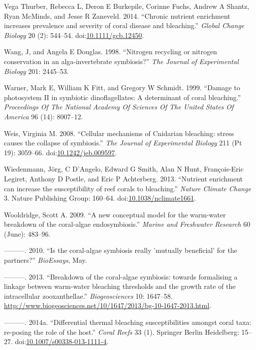 \documentclass[]{elsarticle} %
\begin{document}
\hypertarget{ref-VegaThurber:2014hk}{}
Vega Thurber, Rebecca L, Deron E Burkepile, Corinne Fuchs, Andrew A
Shantz, Ryan McMinds, and Jesse R Zaneveld. 2014. ``Chronic nutrient
enrichment increases prevalence and severity of coral disease and
bleaching.'' \emph{Global Change Biology} 20 (2): 544--54.
doi:\href{https://doi.org/10.1111/gcb.12450}{10.1111/gcb.12450}.

\hypertarget{ref-Wang:1998p128}{}
Wang, J, and Angela E Douglas. 1998. ``Nitrogen recycling or nitrogen
conservation in an alga-invertebrate symbiosis?'' \emph{The Journal of
Experimental Biology} 201: 2445--53.

\hypertarget{ref-Warner:1999p4239}{}
Warner, Mark E, William K Fitt, and Gregory W Schmidt. 1999. ``Damage to
photosystem II in symbiotic dinoflagellates: A determinant of coral
bleaching.'' \emph{Proceedings Of The National Academy Of Sciences Of
The United States Of America} 96 (14): 8007--12.

\hypertarget{ref-Weis:2008p944}{}
Weis, Virginia M. 2008. ``Cellular mechanisms of Cnidarian bleaching:
stress causes the collapse of symbiosis.'' \emph{The Journal of
Experimental Biology} 211 (Pt 19): 3059--66.
doi:\href{https://doi.org/10.1242/jeb.009597}{10.1242/jeb.009597}.

\hypertarget{ref-Wiedenmann:2013bn}{}
Wiedenmann, Jörg, C D'Angelo, Edward G Smith, Alan N Hunt, François-Eric
Legiret, Anthony D Postle, and Eric P Achterberg. 2013. ``Nutrient
enrichment can increase the susceptibility of reef corals to
bleaching.'' \emph{Nature Climate Change} 3. Nature Publishing Group:
160--64.
doi:\href{https://doi.org/10.1038/nclimate1661}{10.1038/nclimate1661}.

\hypertarget{ref-Wooldridge:2009p7807}{}
Wooldridge, Scott A. 2009. ``A new conceptual model for the warm-water
breakdown of the coral-algae endosymbiosis.'' \emph{Marine and
Freshwater Research} 60 (June): 483--96.

\hypertarget{ref-Wooldridge:2010p7809}{}
---------. 2010. ``Is the coral-algae symbiosis really 'mutually
beneficial' for the partners?'' \emph{BioEssays}, May.

\hypertarget{ref-Wooldridge:2013tj}{}
---------. 2013. ``Breakdown of the coral-algae symbiosis: towards
formalising a linkage between warm-water bleaching thresholds and the
growth rate of the intracellular zooxanthellae.'' \emph{Biogeosciences}
10: 1647--58.
\url{http://www.biogeosciences.net/10/1647/2013/bg-10-1647-2013.html}.

\hypertarget{ref-Wooldridge:2014di}{}
---------. 2014a. ``Differential thermal bleaching susceptibilities
amongst coral taxa: re-posing the role of the host.'' \emph{Coral Reefs}
33 (1). Springer Berlin Heidelberg: 15--27.
doi:\href{https://doi.org/10.1007/s00338-013-1111-4}{10.1007/s00338-013-1111-4}.
\end{document}
